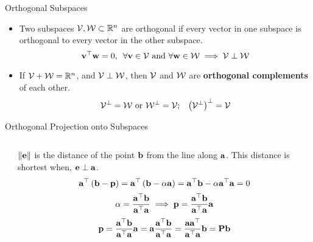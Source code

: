 \documentclass[aspectratio=169]{beamer}
\let\olditem\item
\renewcommand{\item}{\setlength{\itemsep}{\fill}\olditem}
\def\mf{\ensuremath\mathbf}
\def\mb{\ensuremath\mathbb}
\def\mc{\ensuremath\mathcal}
\begin{document}
\begin{frame}[t]{Orthogonal Subspaces}
\begin{itemize}
\item Two subspaces $\mc{V}, \mc{W} \subset \mb{R}^n$ are orthogonal if every vector in one subspace is orthogonal to every vector in the other subspace.
\[ \mf{v}^\top\mf{w} = 0, \,\,\, \forall \mf{v} \in \mc{V} \text{ and } \forall\mf{w} \in \mc{W} \implies \mc{V} \perp \mc{W} \]

\item If $\mc{V} + \mc{W} = \mb{R}^n$, and $\mc{V} \perp \mc{W}$, then $\mc{V}$ and $\mc{W}$ are \textbf{orthogonal complements} of each other.
\[ \mc{V}^{\perp} = \mc{W} \text{ or } \mc{W}^{\perp} = \mc{V}; \,\,\,\,\, \left(\mc{V}^{\perp}\right)^{\perp} = \mc{V} \]
\end{itemize}
\end{frame}


\begin{frame}[t]{Orthogonal Projection onto Subspaces}
\begin{columns}
\begin{column}{0.5\textwidth}
\begin{center}
\end{center}
\end{column}
\begin{column}{0.45\textwidth}
$\left\lVert \mf{e}\right\rVert$ is the distance of the point $\mf{b}$ from the line along $\mf{a}$. This distance is shortest when, $\mf{e} \perp \mf{a}$.
\[ \mf{a}^\top\left(\mf{b} - \mf{p}\right) = \mf{a}^\top\left(\mf{b} - \alpha \mf{a}\right) = \mf{a}^\top\mf{b} - \alpha \mf{a}^\top\mf{a} = 0 \]
\[ \alpha = \frac{\mf{a}^\top\mf{b}}{\mf{a}^\top\mf{a}} \implies \mf{p} = \frac{\mf{a}^\top\mf{b}}{\mf{a}^\top\mf{a}}\mf{a} \]
\[ \mf{p} = \frac{\mf{a}^\top\mf{b}}{\mf{a}^\top\mf{a}}\mf{a} =  \mf{a}\frac{\mf{a}^\top\mf{b}}{\mf{a}^\top\mf{a}} = \frac{\mf{a}\mf{a}^\top}{\mf{a}^\top\mf{a}}\mf{b} = \mf{Pb} \]
\end{column}
\end{columns}
\end{frame}
\end{document}
